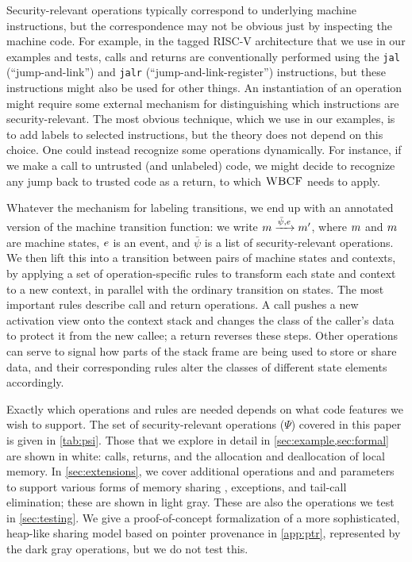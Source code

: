 \documentclass[10pt,conference]{ieeetran}%
\theoremstyle{definition}
\begin{document}
Security-relevant operations typically correspond to
 underlying machine instructions,
but the correspondence may not be obvious just by inspecting the machine code.
For example, in the tagged RISC-V architecture that we use in our
examples and tests,
calls and returns are conventionally performed using the {\tt jal}
(``jump-and-link'')
and {\tt jalr} (``jump-and-link-register'') instructions, but these
instructions might also be used for other things. An instantiation of
an operation
might require some external mechanism for distinguishing which instructions are
security-relevant. The most obvious technique,
which we use in our examples, is to add labels to selected instructions, but the theory does not
depend on this choice. One could instead recognize some operations dynamically. For instance,
if we make a call to untrusted (and unlabeled) code, we might decide to recognize
any jump back to trusted code as a return, to which \(\textnormal{\sc WBCF}\) needs to apply.

Whatever the mechanism for labeling transitions, we end up with an annotated version of the
machine transition function: we write \(m \xrightarrow{\bar{\psi},
  e} m'\), where \(m\) and \(m\) are machine states, \(e\) is
an event, and \(\bar{\psi}\) is a list of security-relevant operations.
%
We then lift this into a transition between pairs of machine states and contexts,
by applying a set of operation-specific rules to transform each state and context to
a new context, in parallel with the ordinary transition on states.
The most important rules describe call and return operations.
A call pushes a new activation view onto the context stack and changes the class of the
caller's data to protect it from the new callee; a return reverses these steps.
Other operations can serve to signal how parts of the stack frame are being used to store
or share data, and their corresponding rules alter the classes of different
state elements accordingly.

Exactly which operations and rules are needed depends on
what code features we wish to support.
The set of security-relevant operations (\(\Psi\)) covered in this paper is given in
\cref{tab:psi}. Those that we explore in detail in \cref{sec:example,sec:formal}
are shown in white: calls, returns, and the allocation and deallocation of local memory.
In \cref{sec:extensions}, we cover additional operations and and parameters
to support various forms of memory sharing \ifexceptions , exceptions, \fi
and tail-call elimination; these are shown in light gray. These are also
the operations we test in \cref{sec:testing}.
We give a proof-of-concept formalization of a more sophisticated, heap-like sharing model
based on pointer provenance in \cref{app:ptr}, represented by the dark gray
operations, but we do not test this.
\end{document}
